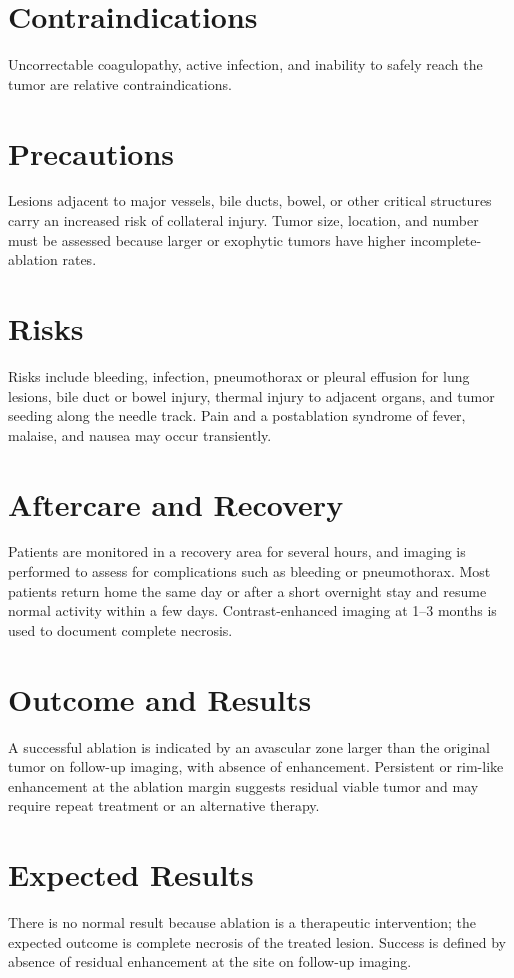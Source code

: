 \section*{Contraindications}
Uncorrectable coagulopathy, active infection, and inability to safely reach the tumor are relative contraindications.

\section*{Precautions}
Lesions adjacent to major vessels, bile ducts, bowel, or other critical structures carry an increased risk of collateral injury. Tumor size, location, and number must be assessed because larger or exophytic tumors have higher incomplete-ablation rates.

\section*{Risks}
Risks include bleeding, infection, pneumothorax or pleural effusion for lung lesions, bile duct or bowel injury, thermal injury to adjacent organs, and tumor seeding along the needle track. Pain and a postablation syndrome of fever, malaise, and nausea may occur transiently.

\section*{Aftercare and Recovery}
Patients are monitored in a recovery area for several hours, and imaging is performed to assess for complications such as bleeding or pneumothorax. Most patients return home the same day or after a short overnight stay and resume normal activity within a few days. Contrast-enhanced imaging at 1--3 months is used to document complete necrosis.

\section*{Outcome and Results}
A successful ablation is indicated by an avascular zone larger than the original tumor on follow-up imaging, with absence of enhancement. Persistent or rim-like enhancement at the ablation margin suggests residual viable tumor and may require repeat treatment or an alternative therapy.

\section*{Expected Results}
There is no normal result because ablation is a therapeutic intervention; the expected outcome is complete necrosis of the treated lesion. Success is defined by absence of residual enhancement at the site on follow-up imaging.


